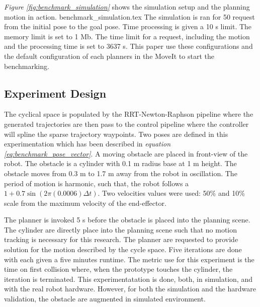 \documentclass[a4paper, 10pt]{article}
\newcommand\thisPaperDir{/home/asl/version-control/ws_thesis/writing_papers/resampling_planning_in_dynamic_environment}
\numberwithin{equation}{section} %
\begin{document}
{\textit{Figure \ref{fig:benchmark_simulation}} shows the simulation 
setup and the planning motion in action. 
{benchmark_simulation.tex}
The simulation is ran for 50 request from the initial pose to 
the goal pose. Time processing is given a 10 s limit. The memory limit
is set to 1 Mb. The time limit for a request, including the motion and the
processing time is set to 3637 s. This paper use these configurations and
the default configuration of each planners in the MoveIt to start the benchmarking. 
\subsection{Experiment Design}
The cyclical space is populated by the RRT-Newton-Raphson
pipeline where the generated trajectories are
then pass to the control pipeline where
the controller will spline the sparse trajectory
waypoints. Two poses are defined in this experimentation which
has been described in \textit{equation \ref{eq:benchmark_pose_vector}}.
A moving obstacle are placed in front-view of the robot. The obstacle
is a cylinder with 0.1 m radius base at 1 m height. 
The obstacle moves from 0.3 m to 1.7 m away from the robot
in oscillation. The period of motion is harmonic, such that, 
the robot follows a $1+0.7\sin(2\pi(0.0006)\Delta t)$. Two velocities 
values were used: 50\% and 10\% scale from the maximum velocity 
of the end-effector. 

The planner is invoked 5 s before the obstacle is placed 
into the planning scene. The cylinder
are directly place into the planning scene such that no motion 
tracking is necessary for this research. The planner are requested to
provide solution for the motion described by the cycle space. 
Five iterations are done with each given a five minutes runtime. The metric
use for this experiment is the time on first collision where,
when the prototype touches the cylinder, the iteration is terminated. 
This experimentatation
is done, both, in simulation, and with
the real robot hardware. However, for both the simulation and the hardware
validation, the obstacle are augmented in simulated environment.
}
\end{document}
